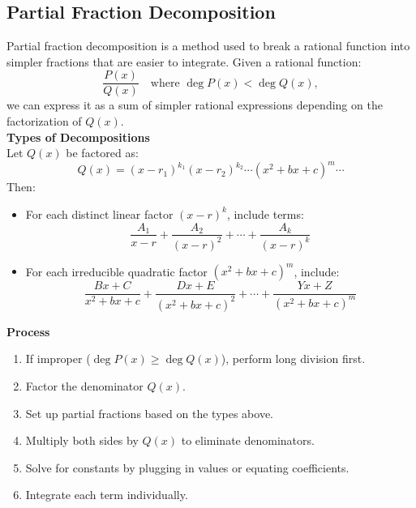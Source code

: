 \documentclass[11pt]{article}
\begin{document}
\subsection{Partial Fraction Decomposition}
Partial fraction decomposition is a method used to break a rational function into simpler fractions that are easier to integrate.
Given a rational function:
\[
    \frac{P(x)}{Q(x)} \quad \text{where } \deg P(x) < \deg Q(x),
\]
we can express it as a sum of simpler rational expressions depending on the factorization of $Q(x)$.\\[.5em]
\textbf{Types of Decompositions}\\[.5em]
\noindent
Let $Q(x)$ be factored as:
\[
    Q(x) = (x - r_1)^{k_1}(x - r_2)^{k_2}\cdots (x^2 + bx + c)^m\cdots
\]Then:
\begin{itemize}
    \item For each distinct linear factor $(x - r)^k$, include terms:
    \[
    \frac{A_1}{x - r} + \frac{A_2}{(x - r)^2} + \cdots + \frac{A_k}{(x - r)^k}
    \]
    
    \item For each irreducible quadratic factor $(x^2 + bx + c)^m$, include:
    \[
    \frac{Bx + C}{x^2 + bx + c} + \frac{Dx + E}{(x^2 + bx + c)^2} + \cdots + \frac{Yx + Z}{(x^2 + bx + c)^m}
    \]
\end{itemize}
\noindent
\textbf{Process}
\begin{enumerate}
    \item If improper ($\deg P(x) \geq \deg Q(x)$), perform long division first.
    \item Factor the denominator $Q(x)$.
    \item Set up partial fractions based on the types above.
    \item Multiply both sides by $Q(x)$ to eliminate denominators.
    \item Solve for constants by plugging in values or equating coefficients.
    \item Integrate each term individually.
\end{enumerate}
\end{document}

